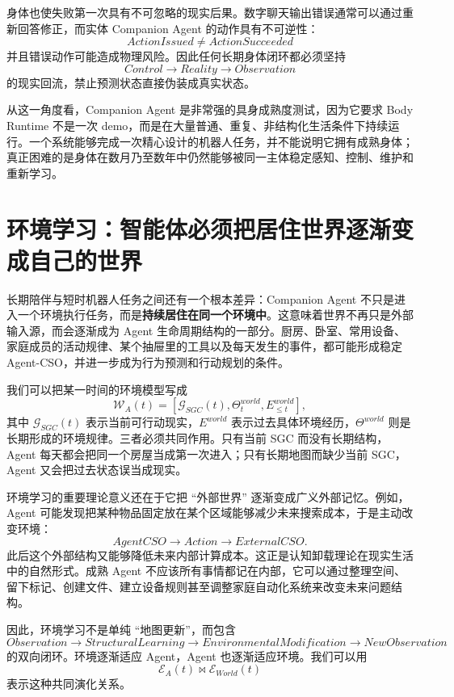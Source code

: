 身体也使失败第一次具有不可忽略的现实后果。数字聊天输出错误通常可以通过重新回答修正，而实体 Companion Agent 的动作具有不可逆性：
\[
ActionIssued
\neq
ActionSucceeded
\]
并且错误动作可能造成物理风险。因此任何长期身体闭环都必须坚持
\[
Control
\rightarrow
Reality
\rightarrow
Observation
\]
的现实回流，禁止预测状态直接伪装成真实状态。

从这一角度看，Companion Agent 是非常强的具身成熟度测试，因为它要求 Body Runtime 不是一次 demo，而是在大量普通、重复、非结构化生活条件下持续运行。一个系统能够完成一次精心设计的机器人任务，并不能说明它拥有成熟身体；真正困难的是身体在数月乃至数年中仍然能够被同一主体稳定感知、控制、维护和重新学习。

\section{环境学习：智能体必须把居住世界逐渐变成自己的世界}

长期陪伴与短时机器人任务之间还有一个根本差异：Companion Agent 不只是进入一个环境执行任务，而是\textbf{持续居住在同一个环境中}。这意味着世界不再只是外部输入源，而会逐渐成为 Agent 生命周期结构的一部分。厨房、卧室、常用设备、家庭成员的活动规律、某个抽屉里的工具以及每天发生的事件，都可能形成稳定 Agent-CSO，并进一步成为行为预测和行动规划的条件。

我们可以把某一时间的环境模型写成
\[
\mathcal W_A(t)
=
\left[
\mathcal G_{SGC}(t),
\Theta^{world}_t,
E^{world}_{\leq t}
\right],
\]
其中 $\mathcal G_{SGC}(t)$ 表示当前可行动现实，$E^{world}$ 表示过去具体环境经历，$\Theta^{world}$ 则是长期形成的环境规律。三者必须共同作用。只有当前 SGC 而没有长期结构，Agent 每天都会把同一个房屋当成第一次进入；只有长期地图而缺少当前 SGC，Agent 又会把过去状态误当成现实。

环境学习的重要理论意义还在于它把 ``外部世界'' 逐渐变成广义外部记忆。例如，Agent 可能发现把某种物品固定放在某个区域能够减少未来搜索成本，于是主动改变环境：
\[
AgentCSO
\rightarrow
Action
\rightarrow
ExternalCSO.
\]
此后这个外部结构又能够降低未来内部计算成本。这正是认知卸载理论在现实生活中的自然形式。成熟 Agent 不应该所有事情都记在内部，它可以通过整理空间、留下标记、创建文件、建立设备规则甚至调整家庭自动化系统来改变未来问题结构。

因此，环境学习不是单纯 ``地图更新''，而包含
\[
Observation
\rightarrow
StructuralLearning
\rightarrow
EnvironmentalModification
\rightarrow
NewObservation
\]
的双向闭环。环境逐渐适应 Agent，Agent 也逐渐适应环境。我们可以用
\[
\mathcal E_{A}(t)
\bowtie
\mathcal E_{World}(t)
\]
表示这种共同演化关系。

